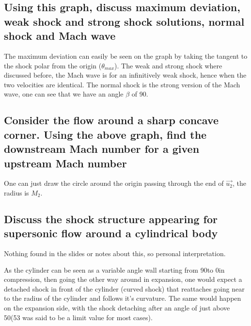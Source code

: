 \documentclass[british,french,11pt, a4paper, openany]{article}
\begin{document}
\subsection{Using this graph, discuss maximum deviation, weak shock and strong shock solutions, normal shock and Mach wave}
The maximum deviation can easily be seen on the graph by taking the tangent to the shock polar from the origin ($\theta_{max}$). The weak and strong shock where discussed before, the Mach wave is for an infinitively weak shock, hence when the two velocities are identical. The normal shock is the strong version of the Mach wave, one can see that we have an angle $\beta$ of 90\degres .

\subsection{Consider the flow around a sharp concave corner. Using the above graph,	find the downstream Mach number for a given upstream Mach number}
One can just draw the circle around the origin passing through the end of $\vec{u_2}$, the radius is $M_2$.

\subsection{Discuss the shock structure appearing for supersonic flow around a cylindrical body}
Nothing found in the slides or notes about this, so personal interpretation.

As the cylinder can be seen as a variable angle wall starting from 90\degres to 0\degres in compression, then going the other way around in expansion, one would expect a detached shock in front of the cylinder (curved shock) that reattaches going near to the radius of the cylinder and follows it's curvature. The same would happen on the expansion side, with the shock detaching after an angle of just above 50\degres (53 was said to be a limit value for most cases).
\end{document}
